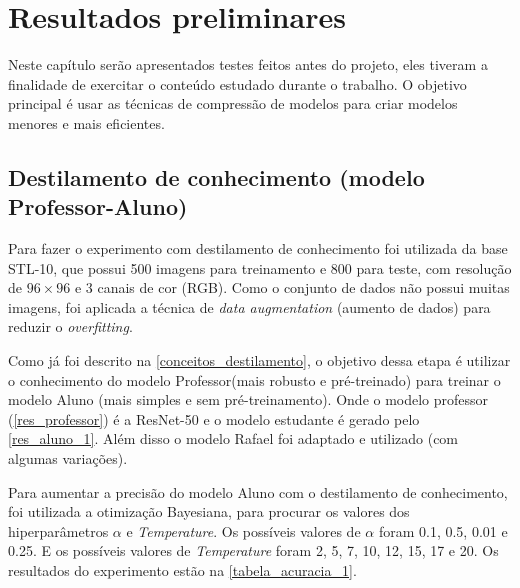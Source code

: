\chapter{Resultados preliminares}

Neste capítulo serão apresentados testes feitos antes do projeto, eles tiveram a finalidade de exercitar o
conteúdo estudado durante o trabalho. O objetivo principal é usar as técnicas de compressão de modelos para
criar modelos menores e mais eficientes.


\section{Destilamento de conhecimento (modelo Professor-Aluno)}
Para fazer o experimento com destilamento de conhecimento foi utilizada da base STL-10, que possui 500 imagens para
treinamento e 800 para teste, com resolução de $96 \times 96$ e 3 canais de cor (RGB). Como o conjunto de dados
não possui muitas imagens, foi aplicada a técnica de \textit{data augmentation} (aumento de dados) para reduzir o
\textit{overfitting}.

Como já foi descrito na \autoref{conceitos_destilamento}, o objetivo dessa etapa é utilizar o conhecimento do modelo
Professor(mais robusto e pré-treinado) para treinar o modelo Aluno (mais simples e sem pré-treinamento).
Onde o modelo professor (\autoref{res_professor}) é a ResNet-50  \cite{resnet} e o modelo estudante é gerado pelo
\autoref{res_aluno_1}.
Além disso o modelo Rafael \cite{rafael} foi adaptado e utilizado (com algumas variações).

Para aumentar a precisão do modelo Aluno com o destilamento de conhecimento, foi utilizada a otimização
Bayesiana, para procurar os valores dos hiperparâmetros $\alpha$ e \textit{Temperature}.
Os possíveis valores de $\alpha$ foram 0.1, 0.5, 0.01 e 0.25.
E os possíveis valores de \textit{Temperature} foram 2, 5, 7, 10, 12, 15, 17 e 20.
Os resultados do experimento estão na \autoref{tabela_acuracia_1}.

